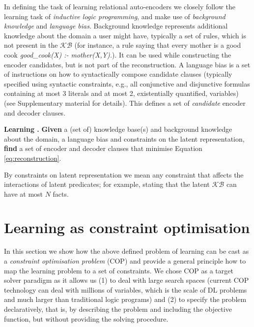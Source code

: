 In defining the task of learning relational auto-encoders we closely follow the learning task of \textit{inductive logic programming}, and make use of \textit{background knowledge} and \textit{language bias}.
Background knowledge represents additional knowledge about the domain a user might have, typically a set of rules, which is not present in the $\mathcal{KB}$ (for instance, a rule saying that every mother is a good cook \textit{good\_cook(X) :- mother(X,Y).}).
It can be used while constructing the encoder candidates, but is not part of the reconstruction.
A language bias is a set of instructions on how to syntactically compose candidate clauses (typically specified using syntactic constraints, e.g., all conjunctive and disjunctive formulas containing at most 3 literals and at most 2, existentially quantified, variables) (see Supplementary material for details).
This defines a set of \textit{candidate} encoder and decoder clauses.



\begin{definition}
\textbf{Learning .}
\textbf{Given} a (set of) knowledge base(s) and background knowledge about the domain, a language bias and constraints on the latent representation, \textbf{find} a set of encoder and decoder clauses that minimise Equation \ref{eq:reconstruction}.
\end{definition}

By constraints on latent representation we mean any constraint that affects the interactions of latent predicates; for example, stating that the latent $\mathcal{KB}$ can have at most $N$ facts.



\section{Learning as constraint optimisation}

In this section we show how the above defined problem of learning  can be cast as a \textit{constraint optimisation problem} (COP) \cite{Rossi:2006:HCP:1207782} and provide a general principle how to map the learning problem to a set of constraints.
We chose COP as a target solver paradigm as it allows us (1) to deal with large search spaces (current COP technology can deal with millions of variables, which is the scale of DL problems and much larger than traditional logic programs) and (2) to specify the problem declaratively, that is, by describing the problem and including the objective function, but without providing the solving procedure.



